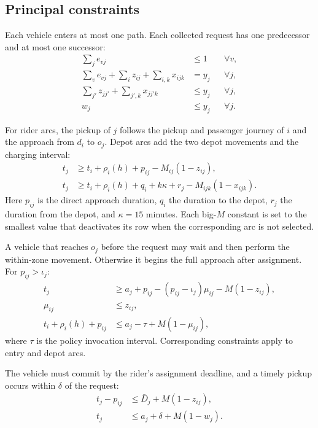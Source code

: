 \subsection{Principal constraints}

Each vehicle enters at most one path. Each collected request has one predecessor and at most one
successor:
\begin{align}
  \textstyle\sum_j e_{vj} &\leq 1 && \forall v, \\
  \textstyle\sum_v e_{vj} + \sum_i z_{ij} + \sum_{i,k}x_{ijk} &= y_j && \forall j, \\
  \textstyle\sum_{j'} z_{jj'} + \sum_{j',k}x_{jj'k} &\leq y_j && \forall j, \\
  w_j &\leq y_j && \forall j.
\end{align}

For rider arcs, the pickup of $j$ follows the pickup and passenger journey of $i$ and the approach from
$d_i$ to $o_j$. Depot arcs add the two depot movements and the charging interval:
\begin{align}
  t_j &\geq t_i + \rho_i(h) + p_{ij} - M_{ij}(1-z_{ij}), \\
  t_j &\geq t_i + \rho_i(h) + q_i + k\kappa + r_j - M_{ijk}(1-x_{ijk}).
  \label{eq:sequence}
\end{align}
Here $p_{ij}$ is the direct approach duration, $q_i$ the duration to the depot, $r_j$ the duration from
the depot, and $\kappa=15$ minutes. Each big-$M$ constant is set to the smallest value that deactivates
its row when the corresponding arc is not selected.

A vehicle that reaches $o_j$ before the request may wait and then perform the within-zone movement.
Otherwise it begins the full approach after assignment. For $p_{ij}>\iota_j$:
\begin{align}
  t_j &\geq a_j+p_{ij}-(p_{ij}-\iota_j)\mu_{ij}-M(1-z_{ij}), \\
  \mu_{ij} &\leq z_{ij}, \\
  t_i+\rho_i(h)+p_{ij} &\leq a_j-\tau+M(1-\mu_{ij}),
  \label{eq:preposition}
\end{align}
where $\tau$ is the policy invocation interval. Corresponding constraints apply to entry and depot
arcs.

The vehicle must commit by the rider's assignment deadline, and a timely pickup occurs within
$\delta$ of the request:
\begin{align}
  t_j-p_{ij} &\leq \bar D_j+M(1-z_{ij}), \\
  t_j &\leq a_j+\delta+M(1-w_j).
  \label{eq:service}
\end{align}

